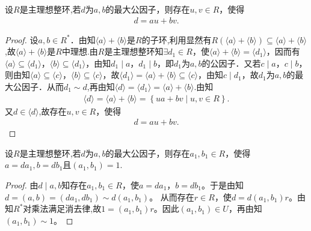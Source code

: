 \documentclass[../../main.tex]{subfiles}%
\begin{document}
\begin{corollary}\label{corollary:抽象代数--推论2.5.1}
设$R$是主理想整环,若$d$为$a, b$的最大公因子，则存在$u, v \in R$，使得
\begin{align*}
d = au + bv. 
\end{align*}
\end{corollary}
\begin{proof}
设$a, b \in R^*$．由知$\langle a \rangle + \langle b \rangle$是$R$的子环,利用显然有$R(\langle a \rangle + \langle b \rangle)\subseteq \langle a \rangle + \langle b \rangle$,故$\langle a \rangle + \langle b \rangle$是$R$中理想.由$R$是主理想整环知$\exists d_1 \in R$，使$\langle a \rangle + \langle b \rangle = \langle d_1 \rangle$，因而有$\langle a \rangle \subseteq \langle d_1 \rangle$，$\langle b \rangle \subseteq \langle d_1 \rangle$，由知$d_1 \mid a$，$d_1 \mid b$，即$d_1$为$a, b$的公因子．又若$c \mid a$，$c \mid b$，则由知$\langle a \rangle \subseteq \langle c \rangle$，$\langle b \rangle \subseteq \langle c \rangle$，故$\langle d_1 \rangle = \langle a \rangle + \langle b \rangle \subseteq \langle c \rangle$，由知$c \mid d_1$，故$d_1$为$a, b$的最大公因子．从而$d_1\sim d$,再由知$\langle d \rangle=\langle d_1 \rangle = \langle a \rangle + \langle b \rangle$.由知
\begin{align*}
\langle d\rangle =\langle a\rangle +\langle b\rangle =\left\{ ua+bv\mid u,v\in R \right\} .
\end{align*}
又$d\in \langle d\rangle$,故存在$u, v \in R$，使得
\begin{align*}
d = au + bv. 
\end{align*}
\end{proof}

\begin{corollary}\label{corollary:最大公因子的性质-1}
设$R$是主理想整环,若$d$为$a, b$的最大公因子，则存在$a_1, b_1 \in R$，使得$a=da_1,b=db_1$且$(a_1,b_1)=1.$
\end{corollary}
\begin{proof}
由$d\mid a,b$知存在$a_1,b_1\in R$，使$a=da_1$，$b=db_1$。于是由知
$d=(a,b)=(da_1,db_1)\sim d(a_1,b_1)$。
从而存在$r\in R$，使$d=d(a_1,b_1)r$。由知$R^*$对乘法满足消去律,故$1=(a_1,b_1)r$。因此$(a_1,b_1)\in U$，再由知$(a_1,b_1)\sim 1$。
\end{proof}
\end{document}
